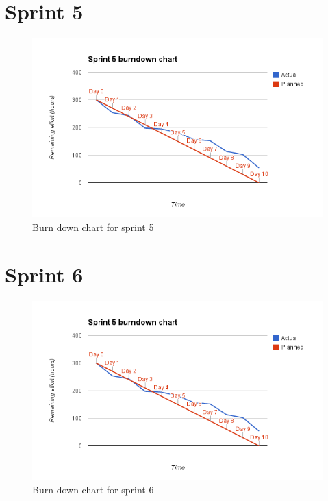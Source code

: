 \section{Sprint 5}
\begin{figure}[H]
\includegraphics[width=\textwidth]{appendix/backlog/burndown5.png}
\caption{Burn down chart for sprint 5}
\end{figure}


\section{Sprint 6}
\begin{figure}[H]
\includegraphics[width=\textwidth]{appendix/backlog/burndown5.png}
\caption{Burn down chart for sprint 6}
\end{figure}


